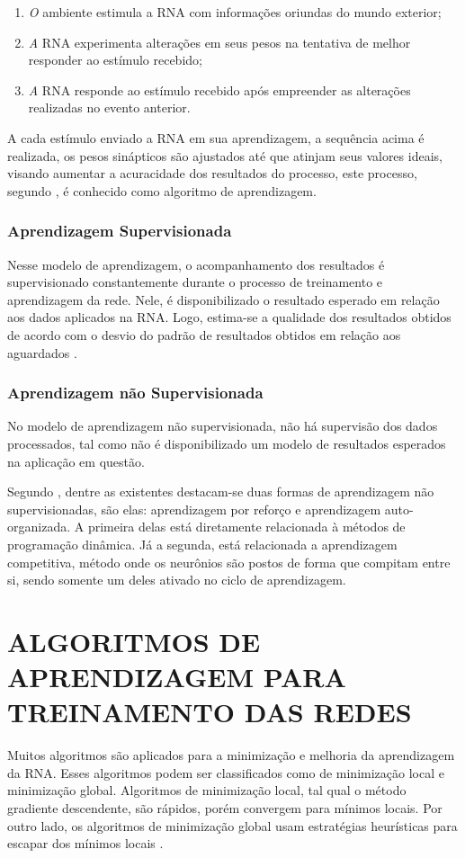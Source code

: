 \begin{enumerate}
	\item \textit O ambiente estimula a RNA com informações oriundas do mundo exterior;
	\item \textit A RNA experimenta alterações em seus pesos na tentativa de melhor responder ao estímulo recebido;
	\item \textit A RNA responde ao estímulo recebido após empreender as alterações realizadas no evento anterior.
\end{enumerate}

A cada estímulo enviado a RNA em sua aprendizagem, a sequência acima é realizada, os pesos sinápticos são ajustados até que atinjam seus valores ideais, visando aumentar a acuracidade dos resultados do processo, este processo, segundo , é conhecido como algoritmo de aprendizagem.

\subsubsection{Aprendizagem Supervisionada}
Nesse modelo de aprendizagem, o acompanhamento dos resultados é supervisionado constantemente durante o processo de treinamento e aprendizagem da rede. Nele, é disponibilizado o resultado esperado em relação aos dados aplicados na RNA. Logo, estima-se a qualidade dos resultados obtidos de acordo com o desvio do padrão de resultados obtidos em relação aos aguardados \cite{haykin2009}.

\subsubsection{Aprendizagem não Supervisionada}
No modelo de aprendizagem não supervisionada, não há supervisão dos dados processados, tal como não é disponibilizado um modelo de resultados esperados na aplicação em questão.

Segundo , dentre as existentes destacam-se duas formas de aprendizagem não supervisionadas, são elas: aprendizagem por reforço e aprendizagem auto-organizada. A primeira delas está diretamente relacionada à métodos de programação dinâmica. Já a segunda, está relacionada a aprendizagem competitiva, método onde os neurônios são postos de forma que compitam entre si, sendo somente um deles ativado no ciclo de aprendizagem.

\section{ALGORITMOS DE APRENDIZAGEM PARA TREINAMENTO DAS REDES}\label{algoritmos-aprendizagem}
Muitos algoritmos são aplicados para a minimização e melhoria da aprendizagem da RNA. Esses algoritmos podem ser classificados como de minimização local e minimização global. Algoritmos de minimização local, tal qual o método gradiente descendente, são rápidos, porém convergem para mínimos locais. Por outro lado, os algoritmos de minimização global usam estratégias heurísticas para escapar dos mínimos locais \cite{haykin2000}.

